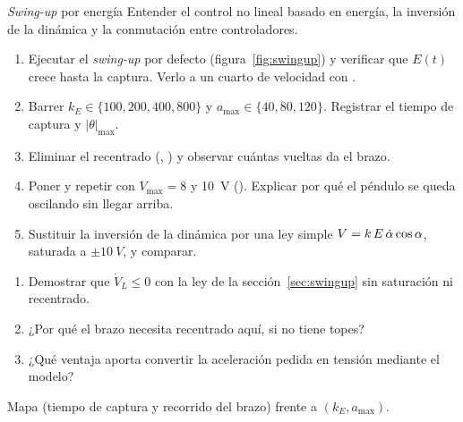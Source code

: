 \label{pr:swing}
\begin{practica}{\emph{Swing-up} por energía}
\objetivos Entender el control no lineal basado en energía, la inversión de la dinámica y la conmutación entre controladores.
\procedimiento
\begin{enumerate}
  \item Ejecutar el \emph{swing-up} por defecto (figura~\ref{fig:swingup}) y verificar que $E(t)$ crece hasta la captura. Verlo a un cuarto de velocidad con .
  \item Barrer $k_E\in\{100,200,400,800\}$ y $a_{\max}\in\{40,80,120\}$. Registrar el tiempo de captura y $|\theta|_{\max}$.
  \item Eliminar el recentrado (, ) y observar cuántas vueltas da el brazo.
  \item Poner  y repetir con $V_{\max}=8$ y \SI{10}{V} (). Explicar por qué el péndulo se queda oscilando sin llegar arriba.
  \item Sustituir la inversión de la dinámica por una ley simple $V=k\,E\,\dot{\alpha}\cos\alpha$, saturada a $\pm\SI{10}{V}$, y comparar.
\end{enumerate}
\preguntas
\begin{enumerate}
  \item Demostrar que $\dot V_L\le0$ con la ley de la sección~\ref{sec:swingup} sin saturación ni recentrado.
  \item ¿Por qué el brazo necesita recentrado aquí, si no tiene topes?
  \item ¿Qué ventaja aporta convertir la aceleración pedida en tensión mediante el modelo?
\end{enumerate}
\entregables Mapa (tiempo de captura y recorrido del brazo) frente a $(k_E,a_{\max})$.
\end{practica}

